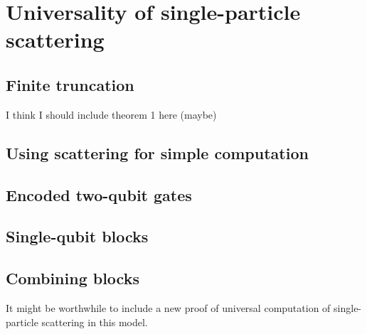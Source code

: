 \documentclass[../thesis-main/thesis-main]{subfiles}
\begin{document}
\chapter{Universality of single-particle scattering}

\section{Finite truncation}

I think I should include theorem 1 here (maybe)

\section{Using scattering for simple computation}


\section{Encoded two-qubit gates}
\section{Single-qubit blocks}
\section{Combining blocks}

It might be worthwhile to include a new proof of universal computation of single-particle scattering in this model.
\end{document}
